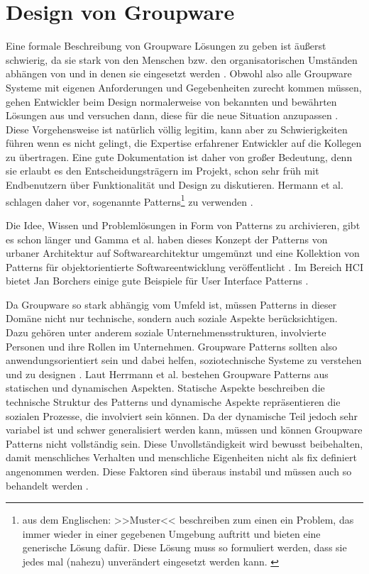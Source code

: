 \section{Design von Groupware} 

Eine formale Beschreibung von Groupware Lösungen zu geben ist äußerst schwierig, da sie stark von den Menschen bzw. den organisatorischen Umständen abhängen von und in denen sie eingesetzt werden \citep{Suchman:1995}. Obwohl also alle Groupware Systeme mit eigenen Anforderungen und Gegebenheiten zurecht kommen müssen, gehen Entwickler beim Design normalerweise von bekannten und bewährten Lösungen aus und versuchen dann, diese für die neue Situation anzupassen \citep{Herrmann:2003}. Diese Vorgehensweise ist natürlich völlig legitim, kann aber zu Schwierigkeiten führen wenn es nicht gelingt, die Expertise erfahrener Entwickler auf die Kollegen zu übertragen. Eine gute Dokumentation ist daher von großer Bedeutung, denn sie erlaubt es den Entscheidungsträgern im Projekt, schon sehr früh mit Endbenutzern über Funktionalität und Design zu diskutieren. Hermann et al. schlagen daher vor, sogenannte Patterns\footnote{aus dem Englischen: >>Muster<< beschreiben zum einen ein Problem, das immer wieder in einer gegebenen Umgebung auftritt und bieten eine generische Lösung dafür. Diese Lösung muss so formuliert werden, dass sie jedes mal (nahezu) unverändert eingesetzt werden kann. \citep{Herrmann:2003}} zu verwenden \citep{Herrmann:2003}. 

\medskip Die Idee, Wissen und Problemlösungen in Form von Patterns zu archivieren, gibt es schon länger und Gamma et al. haben dieses Konzept der Patterns von urbaner Architektur auf Softwarearchitektur umgemünzt und eine Kollektion von Patterns für objektorientierte Softwareentwicklung veröffentlicht \citep{Gamma:1995}. Im Bereich \ac{HCI} bietet Jan Borchers einige gute Beispiele für User Interface Patterns \citep{Borchers:2000}.

\medskip Da Groupware so stark abhängig vom Umfeld ist, müssen Patterns in dieser Domäne nicht nur technische, sondern auch soziale Aspekte berücksichtigen. Dazu gehören unter anderem soziale Unternehmensstrukturen, involvierte Personen und ihre Rollen im Unternehmen. Groupware Patterns sollten also anwendungsorientiert sein und dabei helfen, soziotechnische Systeme zu verstehen und zu designen \citep{Herrmann:2003, Eason:1988}. Laut Herrmann et al. bestehen Groupware Patterns aus statischen und dynamischen Aspekten. Statische Aspekte beschreiben die technische Struktur des Patterns und dynamische Aspekte repräsentieren die sozialen Prozesse, die involviert sein können. Da der dynamische Teil jedoch sehr variabel ist und schwer generalisiert werden kann, müssen und können Groupware Patterns nicht vollständig sein. Diese Unvollständigkeit wird bewusst beibehalten, damit menschliches Verhalten und menschliche Eigenheiten nicht als fix definiert angenommen werden. Diese Faktoren sind überaus instabil und müssen auch so behandelt werden \citep{Herrmann:2003}.

